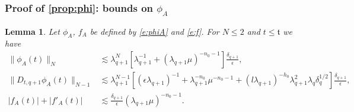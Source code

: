 \documentclass[10pt,a4paper]{amsart}
\numberwithin{equation}{section}
\numberwithin{corollario}{section}
\newtheorem{lemma}{Lemma}
\numberwithin{lemma}{section}
\numberwithin{prop}{section}
\theoremstyle{definition}
\theoremstyle{remark}
\newcommand{\qq}{_{q+1}}
\begin{document}
\subsubsection{Proof of \autoref{prop:phi}: bounds on $\phi_A$}

\begin{lemma}\label{lemma:phiA}
Let $\phi_A$, $f_A$ be defined by \eqref{e:phiA} and \eqref{e:f}.
    For $N\le 2$ and  $t\le \mathfrak{t}$ we have
    \begin{align}
    \|\phi_A(t)\|_N 
    &\lesssim \lambda\qq^N\left[\lambda\qq^{-1}+(\lambda\qq\mu)^{-n_0-1}\right]\frac{\delta\qq}{\epsilon},
    \\
    \|D_{t,q+1}\phi_A(t)\|_{N-1}&\lesssim \lambda\qq^{N-1}\left[(\epsilon\lambda\qq)^{-1}+\lambda\qq^{-n_0}\mu^{-n_0-1}+(l\lambda\qq)^{-h_0}\lambda\qq^2\lambda_q\delta_q^{1/2}\right]
    \frac{\delta\qq}{\epsilon},
    \\
    \label{f_A}|f_A(t)|+|f'_A(t)|&\lesssim \frac{\delta\qq}{\epsilon}(\lambda\qq \mu)^{-n_0-1}.
    \end{align}

\end{lemma}
\end{document}
